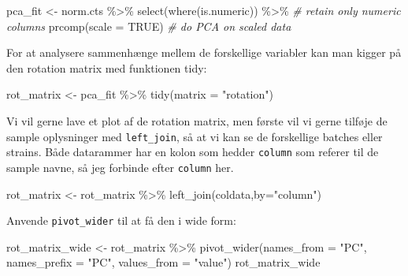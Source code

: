 \documentclass[
]{book}
\newenvironment{Shaded}{\begin{snugshade}}{\end{snugshade}}
\newcommand{\AttributeTok}[1]{\textcolor[rgb]{0.77,0.63,0.00}{#1}}
\newcommand{\CommentTok}[1]{\textcolor[rgb]{0.56,0.35,0.01}{\textit{#1}}}
\newcommand{\ConstantTok}[1]{\textcolor[rgb]{0.00,0.00,0.00}{#1}}
\newcommand{\FunctionTok}[1]{\textcolor[rgb]{0.00,0.00,0.00}{#1}}
\newcommand{\NormalTok}[1]{#1}
\newcommand{\OtherTok}[1]{\textcolor[rgb]{0.56,0.35,0.01}{#1}}
\newcommand{\SpecialCharTok}[1]{\textcolor[rgb]{0.00,0.00,0.00}{#1}}
\newcommand{\StringTok}[1]{\textcolor[rgb]{0.31,0.60,0.02}{#1}}
\begin{document}
\begin{Shaded}
\begin{Highlighting}[]
\NormalTok{pca\_fit }\OtherTok{\textless{}{-}}\NormalTok{ norm.cts }\SpecialCharTok{\%\textgreater{}\%}
  \FunctionTok{select}\NormalTok{(}\FunctionTok{where}\NormalTok{(is.numeric)) }\SpecialCharTok{\%\textgreater{}\%} \CommentTok{\# retain only numeric columns}
  \FunctionTok{prcomp}\NormalTok{(}\AttributeTok{scale =} \ConstantTok{TRUE}\NormalTok{) }\CommentTok{\# do PCA on scaled data}
\end{Highlighting}
\end{Shaded}

For at analysere sammenhænge mellem de forskellige variabler kan man kigger på den rotation matrix med funktionen tidy:

\begin{Shaded}
\begin{Highlighting}[]
\NormalTok{rot\_matrix }\OtherTok{\textless{}{-}}\NormalTok{ pca\_fit }\SpecialCharTok{\%\textgreater{}\%}
  \FunctionTok{tidy}\NormalTok{(}\AttributeTok{matrix =} \StringTok{"rotation"}\NormalTok{) }
\end{Highlighting}
\end{Shaded}

Vi vil gerne lave et plot af de rotation matrix, men første vil vi gerne tilføje de sample oplysninger med \texttt{left\_join}, så at vi kan se de forskellige batches eller strains. Både datarammer har en kolon som hedder \texttt{column} som referer til de sample navne, så jeg forbinde efter \texttt{column} her.

\begin{Shaded}
\begin{Highlighting}[]
\NormalTok{rot\_matrix }\OtherTok{\textless{}{-}}\NormalTok{ rot\_matrix  }\SpecialCharTok{\%\textgreater{}\%} 
  \FunctionTok{left\_join}\NormalTok{(coldata,}\AttributeTok{by=}\StringTok{"column"}\NormalTok{)}
\end{Highlighting}
\end{Shaded}

Anvende \texttt{pivot\_wider} til at få den i wide form:

\begin{Shaded}
\begin{Highlighting}[]
\NormalTok{rot\_matrix\_wide }\OtherTok{\textless{}{-}}\NormalTok{ rot\_matrix }\SpecialCharTok{\%\textgreater{}\%} 
  \FunctionTok{pivot\_wider}\NormalTok{(}\AttributeTok{names\_from =} \StringTok{"PC"}\NormalTok{, }\AttributeTok{names\_prefix =} \StringTok{"PC"}\NormalTok{, }\AttributeTok{values\_from =} \StringTok{"value"}\NormalTok{)}
\NormalTok{rot\_matrix\_wide}
\end{Highlighting}
\end{Shaded}
\end{document}
